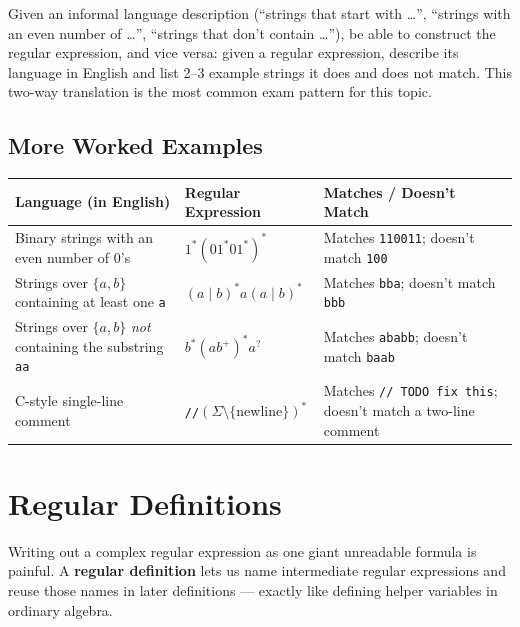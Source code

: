 \documentclass[full-course-notes.tex]{subfiles}
\begin{document}
\begin{examfocus}
Given an informal language description (``strings that start with \dots'', ``strings with an
even number of \dots'', ``strings that don't contain \dots''), be able to construct the regular
expression, and vice versa: given a regular expression, describe its language in English and
list 2--3 example strings it does and does not match. This two-way translation is the most
common exam pattern for this topic.
\end{examfocus}

\subsection{More Worked Examples}
\label{sec:l4-more-worked-examples}

\begin{center}
\renewcommand{\arraystretch}{1.4}
\begin{tabularx}{\textwidth}{@{}X l X@{}}
\toprule
\textbf{Language (in English)} & \textbf{Regular Expression} & \textbf{Matches / Doesn't Match} \\
\midrule
Binary strings with an even number of 0's & $1^{*}(01^{*}01^{*})^{*}$ & Matches \texttt{110011};
doesn't match \texttt{100} \\
Strings over $\{a,b\}$ containing at least one \texttt{a} & $(a\mid b)^{*}a(a\mid b)^{*}$ &
Matches \texttt{bba}; doesn't match \texttt{bbb} \\
Strings over $\{a,b\}$ \emph{not} containing the substring \texttt{aa} & $b^{*}(ab^{+})^{*}a^{?}$
& Matches \texttt{ababb}; doesn't match \texttt{baab} \\
C-style single-line comment & \texttt{//}$(\Sigma \setminus \{\text{newline}\})^{*}$ & Matches
\texttt{// TODO fix this}; doesn't match a two-line comment \\
\bottomrule
\end{tabularx}
\end{center}

\section{Regular Definitions}
\label{sec:l4-regular-definitions}

\dbtag Writing out a complex regular expression as one giant unreadable formula is painful. A
\textbf{regular definition} lets us name intermediate regular expressions and reuse those names
in later definitions --- exactly like defining helper variables in ordinary algebra.
\end{document}
